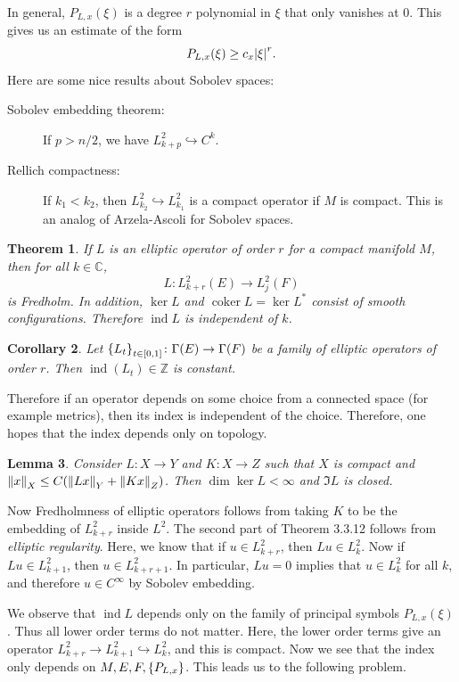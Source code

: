 \documentclass[leqno, openany]{memoir}
\newtheorem{thm}{Theorem}[section]
\newtheorem{cor}[thm]{Corollary}
\newtheorem{lem}[thm]{Lemma}
\theoremstyle{definition}
\theoremstyle{remark}
\theoremstyle{plain}
\theoremstyle{definition}
\theoremstyle{remark}
\newcommand{\C}{\mathbb{C}}
\newcommand{\Z}{\mathbb{Z}}
\DeclareMathOperator{\coker}{coker}
\DeclareMathOperator{\ind}{ind}
\begin{document}
In general, $P_{L, x}(\xi)$ is a degree $r$ polynomial in $\xi$ that only
vanishes at $0$. This gives us an estimate of the form \[ P_{L,x}(\xi) \geq c_x
    \abs{\xi}^r. \] Here are some nice results about Sobolev spaces:
    \begin{description} \item[Sobolev embedding theorem:] If $p > n/2$, we have
        $L^2_{k+p} \hookrightarrow C^k$.  \item[Rellich compactness:] If $k_1 <
        k_2$, then $L^2_{k_2} \hookrightarrow L^2_{k_1}$ is a compact operator
        if $M$ is compact. This is an analog of Arzela-Ascoli for Sobolev
        spaces.  \end{description}

\begin{thm} If $L$ is an elliptic operator of order $r$ for a compact manifold
    $M$, then for all $k \in \C$, \[ L \colon L^2_{k+r}(E) \to L^2_j(F) \] is
    Fredholm. In addition, $\ker L$ and $\coker L = \ker L^*$ consist of smooth
    configurations. Therefore $\ind L$ is independent of $k$.  \end{thm}

\begin{cor} Let $\qty{L_t}_{t \in [0,1]} \colon \Gamma(E) \to \Gamma(F)$ be a
family of elliptic operators of order $r$. Then $\ind(L_t) \in \Z$ is constant.
\end{cor}

Therefore if an operator depends on some choice from a connected space (for
example metrics), then its index is independent of the choice. Therefore, one
hopes that the index depends only on topology.

\begin{lem} Consider $L \colon X \to Y$ and $K \colon X \to Z$ such that $X$ is
compact and $\norm{x}_X \leq C (\norm{Lx}_Y + \norm{Kx}_Z)$. Then $\dim \ker L
< \infty$ and $\Im L$ is closed.  \end{lem}

Now Fredholmness of elliptic operators follows from taking $K$ to be the
embedding of $L^2_{k+r}$ inside $L^2$. The second part of Theorem 3.3.12
follows from \textit{elliptic regularity}. Here, we know that if $u \in
L^2_{k+r}$, then $Lu \in L^2_k$. Now if $Lu \in L^2_{k+1}$, then $u \in
L^2_{k+r+1}$. In particular, $Lu = 0$ implies that $u \in L^2_k$ for all $k$,
and therefore $u \in C^{\infty}$ by Sobolev embedding.

We observe that $\ind L$ depends only on the family of principal symbols
$P_{L,x}(\xi)$. Thus all lower order terms do not matter. Here, the lower order
terms give an operator $L^2_{k+r} \to L^2_{k+1} \hookrightarrow L^2_k$, and
this is compact. Now we see that the index only depends on $M, E, F,
\qty{P_{L,x}}$. This leads us to the following problem.
\end{document}
